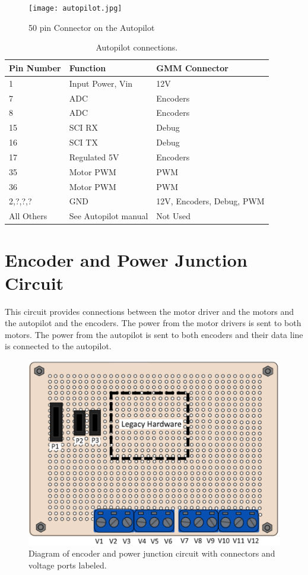 \documentclass[letterpaper,12pt]{report}
\begin{document}
\begin{figure}[h]
	\centering
	\texttt{[image: autopilot.jpg]}
	\caption{50 pin Connector on the Autopilot}
	\label{Figure 1:}
\end{figure}

\begin{table}[h]
	\centering
	\begin{tabular}{| l |l | l |}
 		\hline
 		Pin Number & Function & GMM Connector \\ \hline 
 		1 & Input Power, Vin & 12V \\ \hline
 		7 & ADC & Encoders \\ \hline
 		8 & ADC & Encoders \\ \hline
 		15 & SCI RX & Debug \\ \hline
 		16 & SCI TX & Debug \\ \hline
 		17 & Regulated 5V & Encoders \\ \hline
 		35 & Motor PWM & PWM \\ \hline
 		36 & Motor PWM & PWM \\ \hline
 		2,?,?,? & GND & 12V, Encoders, Debug, PWM \\ \hline
 		All Others & See Autopilot manual & Not Used \\ \hline

	\end{tabular}
	\caption{Autopilot connections.}
\end{table}

\section{Encoder and Power Junction Circuit}
This circuit provides connections between the motor driver and the motors and the autopilot and the encoders. The power from the motor drivers is sent to both motors. The power from the autopilot is sent to both encoders and their data line is connected to the autopilot.
\begin{figure}[h]
	\centering
	\includegraphics[width=1\textwidth]{encodercircuit2.jpg}
	\caption{Diagram of encoder and power junction circuit with connectors and voltage ports labeled.}
	\label{Figure 1:}
\end{figure}
\end{document}
